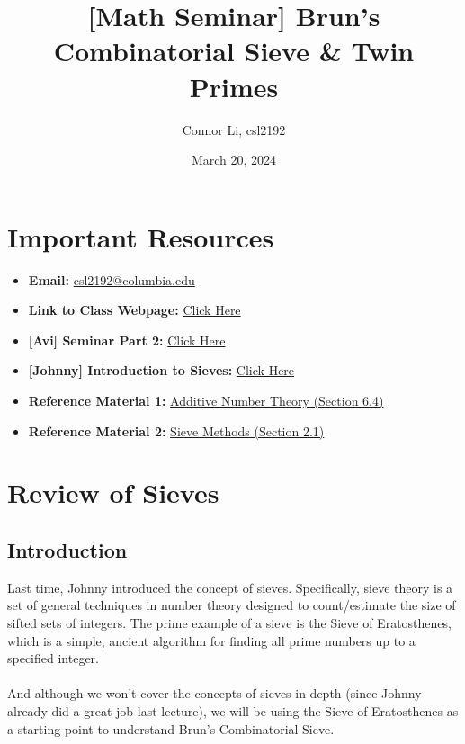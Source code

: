 \documentclass[8pt]{extarticle}
\title{[Math Seminar] Brun's Combinatorial Sieve \& Twin Primes}
\author{Connor Li, csl2192}
\date{March 20, 2024}
\begin{document}
\maketitle

\section*{Important Resources}
\begin{itemize}
    \item \textbf{Email:} \href{mailto:csl2192@columbia.edu}{csl2192@columbia.edu}
    \item \textbf{Link to Class Webpage:} \href{https://www.math.columbia.edu/~avizeff/additive/index.html}{Click Here}
    \item \textbf{[Avi] Seminar Part 2:} \href{https://www.math.columbia.edu/~avizeff/additive/talk_9.5.pdf}{Click Here}
    \item \textbf{[Johnny] Introduction to Sieves:} \href{https://www.math.columbia.edu/~avizeff/additive/talk_10.pdf}{Click Here}
    \item \textbf{Reference Material 1:} \href{http://www.alefenu.com/libri/nathansonbases.pdf}{Additive Number Theory (Section 6.4)}
    \item \textbf{Reference Material 2:} \href{https://pages.cs.wisc.edu/~cdx/Sieve.pdf}{Sieve Methods (Section 2.1)}
\end{itemize}

\tableofcontents   


\pagebreak
\section{Review of Sieves}
\subsection{Introduction}
Last time, Johnny introduced the concept of sieves. Specifically, sieve theory is a set of general techniques in number theory designed to count/estimate the size of sifted sets of integers.
The prime example of a sieve is the Sieve of Eratosthenes, which is a simple, ancient algorithm for finding all prime numbers up to a specified integer.\\
\\
And although we won't cover the concepts of sieves in depth (since Johnny already did a great job last lecture), we will be using the Sieve of Eratosthenes as a starting point to understand Brun's Combinatorial Sieve.
\end{document}
